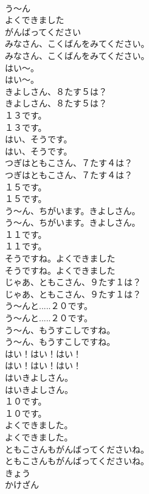 \documentclass[8pt]{extreport}
\begin{document}
\begin{CJK}{UTF8}{min}
\\	う〜ん
\\	よくできました
\\	がんばってください
\\	みなさん、こくばんをみてください。	
\\	みなさん、こくばんをみてください。 
\\	はい～。	
\\	はい～。 
\\	きよしさん、８たす５は？	
\\	きよしさん、８たす５は？ 
\\	１３です。	
\\	１３です。 
\\	はい、そうです。	
\\	はい、そうです。 
\\	つぎはともこさん、７たす４は？	
\\	つぎはともこさん、７たす４は？ 
\\	１５です。	
\\	１５です。 
\\	う～ん、ちがいます。きよしさん。	
\\	う～ん、ちがいます。きよしさん。 
\\	１１です。	
\\	１１です。 
\\	そうですね。よくできました
\\	そうですね。よくできました
\\	じゃあ、ともこさん、９たす１は？	
\\	じゃあ、ともこさん、９たす１は？ 
\\	う～んと.....２０です。	
\\	う～んと.....２０です。 
\\	う～ん、もうすこしですね。	
\\	う～ん、もうすこしですね。 
\\	はい！はい！はい！	
\\	はい！はい！はい！ 
\\	はいきよしさん。	
\\	はいきよしさん。 
\\	１０です。	
\\	１０です。 
\\	よくできました。	
\\	よくできました。 
\\	ともこさんもがんばってくださいね。	
\\	ともこさんもがんばってくださいね。 
\\	きょう
\\	かけざん

\end{CJK}
\end{document}
